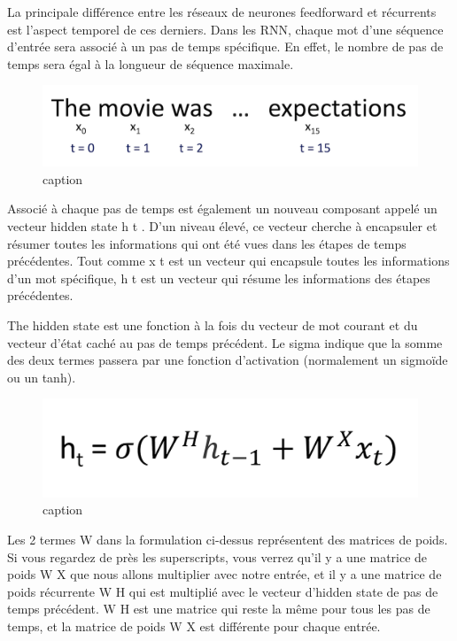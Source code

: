 \documentclass[11pt]{article}
\makeatletter
\def\maxwidth{\ifdim\Gin@nat@width>\linewidth\linewidth
    \else\Gin@nat@width\fi}
\let\Oldincludegraphics\includegraphics
\renewcommand{\includegraphics}[1]{\Oldincludegraphics[width=.8\maxwidth]{#1}}
\makeatother
\begin{document}
La principale différence entre les réseaux de neurones feedforward et
récurrents est l'aspect temporel de ces derniers. Dans les RNN, chaque
mot d'une séquence d'entrée sera associé à un pas de temps spécifique.
En effet, le nombre de pas de temps sera égal à la longueur de séquence
maximale.

\begin{figure}
\centering
\includegraphics{Images/SentimentAnalysis18.png}
\caption{caption}
\end{figure}

Associé à chaque pas de temps est également un nouveau composant appelé
un vecteur hidden state h t . D'un niveau élevé, ce vecteur cherche à
encapsuler et résumer toutes les informations qui ont été vues dans les
étapes de temps précédentes. Tout comme x t est un vecteur qui encapsule
toutes les informations d'un mot spécifique, h t est un vecteur qui
résume les informations des étapes précédentes.

The hidden state est une fonction à la fois du vecteur de mot courant et
du vecteur d'état caché au pas de temps précédent. Le sigma indique que
la somme des deux termes passera par une fonction d'activation
(normalement un sigmoïde ou un tanh).

\begin{figure}
\centering
\includegraphics{Images/SentimentAnalysis15.png}
\caption{caption}
\end{figure}

Les 2 termes W dans la formulation ci-dessus représentent des matrices
de poids. Si vous regardez de près les superscripts, vous verrez qu'il y
a une matrice de poids W X que nous allons multiplier avec notre entrée,
et il y a une matrice de poids récurrente W H qui est multiplié avec le
vecteur d'hidden state de pas de temps précédent. W H est une matrice
qui reste la même pour tous les pas de temps, et la matrice de poids W X
est différente pour chaque entrée.
\end{document}

